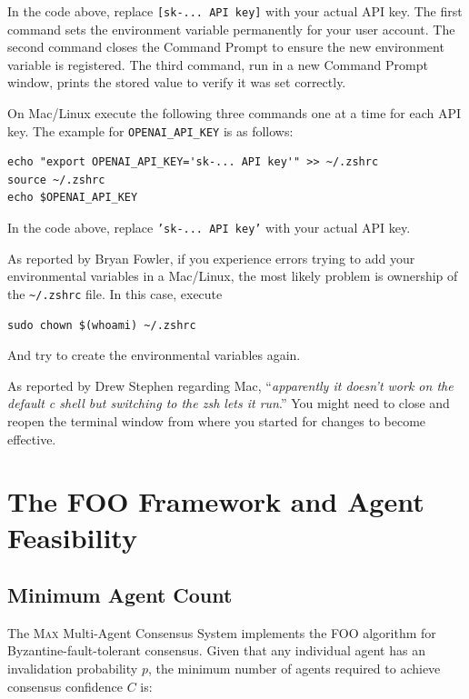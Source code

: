 In the code above, replace \texttt{[sk-... API key]} with your actual API key. The first command sets the environment variable permanently for your user account. The second command closes the Command Prompt to ensure the new environment variable is registered. The third command, run in a new Command Prompt window, prints the stored value to verify it was set correctly.

\vs

On Mac/Linux execute the following three commands one at a time for each API key. The example for \texttt{OPENAI\_API\_KEY} is as follows:

\begin{lstlisting}[style=bashstyle]
echo "export OPENAI_API_KEY='sk-... API key'" >> ~/.zshrc
source ~/.zshrc
echo $OPENAI_API_KEY
\end{lstlisting}

In the code above, replace \texttt{'sk-... API key'} with your actual API key.

\vs

As reported by Bryan Fowler, if you experience errors trying to add your environmental variables in a Mac/Linux, the most likely problem is ownership of the \texttt{\~{}/.zshrc} file. In this case, execute

\begin{lstlisting}[style=bashstyle]
sudo chown $(whoami) ~/.zshrc
\end{lstlisting}

And try to create the environmental variables again.

\vs

As reported by Drew Stephen regarding Mac, ``\textit{apparently it doesn't work on the default c shell but switching to the zsh lets it run}.'' You might need to close and reopen the terminal window from where you started for changes to become effective.

\section{The FOO Framework and Agent Feasibility}
\label{sec:foo}

\subsection{Minimum Agent Count}

The \textsc{Max} Multi-Agent Consensus System implements the FOO
algorithm for Byzantine-fault-tolerant consensus. Given that any
individual agent has an invalidation probability $p$, the minimum number
of agents required to achieve consensus confidence $C$ is:

